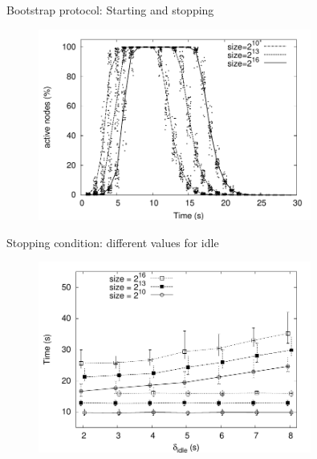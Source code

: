 \begin{frame}{Bootstrap protocol: Starting and stopping}
	
\begin{figure}
	\includegraphics[width=0.80\textwidth]{sort-active}
\end{figure}	
	
\end{frame}

\begin{frame}{Stopping condition: different values for idle}
	
\begin{figure}
	\includegraphics[width=0.80\textwidth]{sort-inactive-time}
\end{figure}	
	
\end{frame}

